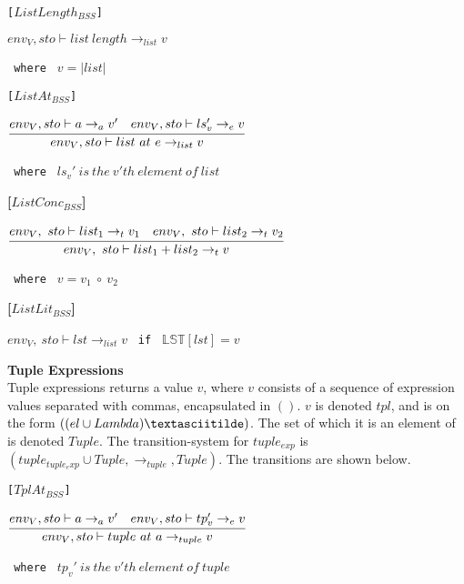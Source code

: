 \texttt{[$ListLength_{BSS}$]}\\
\begin{center}
	\begin{math}
			{env_V, sto \vdash list\ length \rightarrow_{list} v}
	\end{math}
	
	\texttt{ where } $v = |list|$
\end{center}

\texttt{[$ListAt_{BSS}$]}\\
\begin{center}
	\begin{math}
		\cfrac
			{env_V, sto \vdash a \rightarrow_{a} v' \quad env_V, sto \vdash ls_v' \rightarrow_e v}
			{env_V, sto \vdash list\ at\ e \rightarrow_{list} v}
	\end{math}
	
	\texttt{ where } $ls_v'\ is\ the\ v'th\ element\ of\ list$
\end{center}

\textbf{[$ListConc_{BSS}$]}\\
\begin{center}
	\begin{math}
	\cfrac
	{env_V,\ sto \vdash list_1 \rightarrow_t v_1 \quad env_V,\ sto \vdash list_2 \rightarrow_t v_2}
	{env_V,\ sto \vdash list_1 + list_2 \rightarrow_t v}
	\end{math}
	
	\texttt{ where } $v = v_1\ \circ\ v_2$
\end{center}

\textbf{[$ListLit_{BSS}$]}\\
\begin{center}
	\begin{math}
	env_V,\ sto \vdash lst \rightarrow_{list} v
	\end{math}
	\texttt{ if } $\mathbb{LST}[lst] = v$
\end{center}

\textbf{\Large{Tuple Expressions}}\\
Tuple expressions returns a value $v$, where $v$ consists of a sequence of expression values separated with commas, encapsulated in $()$.
$v$ is denoted $tpl$, and is on the form $((el \cup Lambda)\textasciitilde)$.
The set of which it is an element of is denoted $Tuple$.
The transition-system for $tuple_{exp}$ is $(tuple_{tuple_exp} \cup Tuple, \rightarrow_{tuple}, Tuple)$.
The transitions are shown below.

\texttt{[$TplAt_{BSS}$]}\\
\begin{center}
	\begin{math}
	\cfrac
	{env_V, sto \vdash a \rightarrow_{a} v' \quad env_V, sto \vdash tp_v' \rightarrow_e v}
	{env_V, sto \vdash tuple\ at\ a \rightarrow_{tuple} v}
	\end{math}
	
	\texttt{ where } $tp_v'\ is\ the\ v'th\ element\ of\ tuple$
\end{center}

